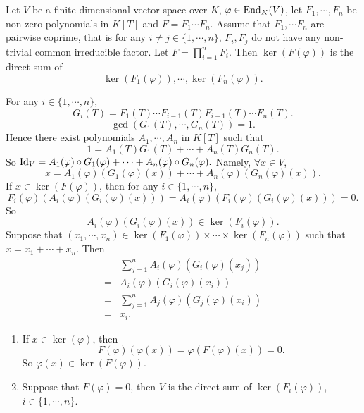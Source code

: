 \begin{theoremenv}
    Let $V$ be a finite dimensional vector space over $K$,
    $\varphi \in \operatorname{\mathrm{End}}_{K}(V)$,
    let $F_1,\cdots,F_n$ be non-zero polynomials in $K[T]$ and $F = F_1 \cdots F_n$.
    Assume that $F_1,\cdots F_n$ are pairwise coprime,
    that is for any $i \neq j \in \{1,\cdots,n\}$, $F_i,F_j$ do not have any non-trivial common irreducible factor.
    Let $F = \prod_{i=1}^{n} F_i$.
    Then $\ker(F(\varphi))$ is the direct sum of
    $$\ker(F_1(\varphi)), \cdots , \ker(F_n(\varphi)).$$
\end{theoremenv}
\begin{proofenv}
    For any $i \in \{1,\cdots,n\}$,
    $$G_{i}(T) = F_1(T) \cdots F_{i-1}(T) F_{i+1}(T) \cdots F_n(T).$$
    $$\gcd(G_{1}(T), \cdots, G_{n}(T)) = 1.$$
    Hence there exist polynomials $A_1,\cdots,A_n$ in $K[T]$ such that
    $$1 = A_1(T) G_1(T) + \cdots + A_n(T)G_n(T).$$
    So $\operatorname{\mathrm{Id}}_{V} = A_1(\varphi) \circ G_{1}(\varphi) + \cdots + A_n(\varphi) \circ G_{n}(\varphi).$
    Namely, $\forall x \in V$,
    $$x = A_1(\varphi) \left(G_1(\varphi)(x)\right) + \cdots + A_n(\varphi) \left(G_n(\varphi)(x)\right).$$
    If $x \in \ker\left(F(\varphi)\right)$,
    then for any $i \in \{1,\cdots,n\}$, 
    $$F_{i}(\varphi)\left(A_{i}(\varphi)\left(G_i(\varphi)(x)\right)\right) = A_i(\varphi)\left(F_i(\varphi)\left(G_i(\varphi)(x)\right)\right) = 0.$$
    So
    $$A_i(\varphi)\left(G_{i}(\varphi)(x)\right) \in \ker\left(F_{i}(\varphi)\right).$$
    Suppose that $(x_1,\cdots,x_n)\in \ker(F_1(\varphi)) \times \cdots \times \ker(F_{n}(\varphi))$ such that $x = x_1 + \cdots + x_n$.
    Then
    $$\begin{aligned}
        & \sum_{j=1}^{n}A_i(\varphi)\left(G_i(\varphi)(x_j)\right)\\
        = & A_i(\varphi)\left(G_i(\varphi)(x_i)\right)\\
        = & \sum_{j=1}^{n} A_{j}(\varphi)\left(G_j(\varphi)(x_i)\right)\\
        =& x_i.
    \end{aligned}$$
\end{proofenv}

\begin{remark}
    \quad
    \begin{enumerate}
        \item If $x \in \ker(\varphi)$, then
            $$F(\varphi)\left(\varphi(x)\right) = \varphi\left(F(\varphi)(x)\right) = 0.$$
            So $\varphi (x) \in \ker(F(\varphi))$.
        \item Suppose that $F(\varphi) = 0$,
            then $V$ is the direct sum of $\ker(F_i(\varphi))$, $i \in \{1,\cdots,n\}$.
    \end{enumerate}
\end{remark}

